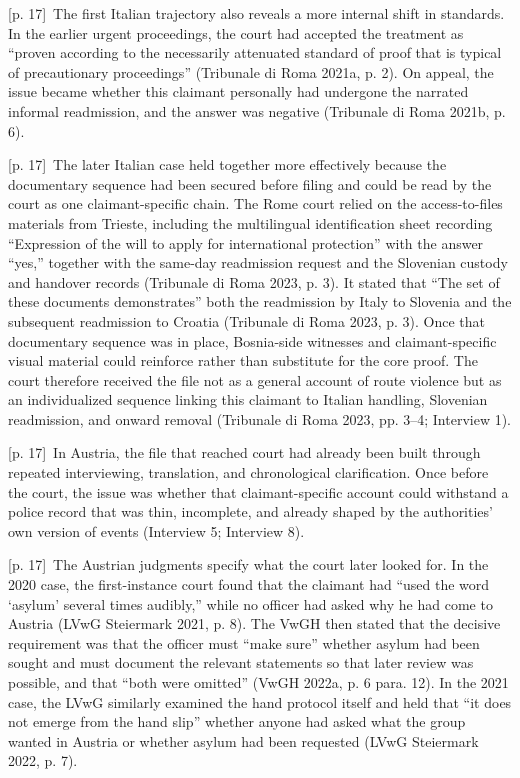 \documentclass[10pt,a4paper]{article}
\begin{document}
{\scriptsize\color{gray} [p. 17]}\ The first Italian trajectory also reveals a more internal shift in standards. In the earlier urgent proceedings, the court had accepted the treatment as “proven according to the necessarily attenuated standard of proof that is typical of precautionary proceedings” (Tribunale di Roma 2021a, p. 2). On appeal, the issue became whether this claimant personally had undergone the narrated informal readmission, and the answer was negative (Tribunale di Roma 2021b, p. 6).\par
{\scriptsize\color{gray} [p. 17]}\ The later Italian case held together more effectively because the documentary sequence had been secured before filing and could be read by the court as one claimant-specific chain. The Rome court relied on the access-to-files materials from Trieste, including the multilingual identification sheet recording “Expression of the will to apply for international protection” with the answer “yes,” together with the same-day readmission request and the Slovenian custody and handover records (Tribunale di Roma 2023, p. 3). It stated that “The set of these documents demonstrates” both the readmission by Italy to Slovenia and the subsequent readmission to Croatia (Tribunale di Roma 2023, p. 3). Once that documentary sequence was in place, Bosnia-side witnesses and claimant-specific visual material could reinforce rather than substitute for the core proof. The court therefore received the file not as a general account of route violence but as an individualized sequence linking this claimant to Italian handling, Slovenian readmission, and onward removal (Tribunale di Roma 2023, pp. 3–4; Interview 1).\par
{\scriptsize\color{gray} [p. 17]}\ In Austria, the file that reached court had already been built through repeated interviewing, translation, and chronological clarification. Once before the court, the issue was whether that claimant-specific account could withstand a police record that was thin, incomplete, and already shaped by the authorities’ own version of events (Interview 5; Interview 8).\par
{\scriptsize\color{gray} [p. 17]}\ The Austrian judgments specify what the court later looked for. In the 2020 case, the first-instance court found that the claimant had “used the word ‘asylum’ several times audibly,” while no officer had asked why he had come to Austria (LVwG Steiermark 2021, p. 8). The VwGH then stated that the decisive requirement was that the officer must “make sure” whether asylum had been sought and must document the relevant statements so that later review was possible, and that “both were omitted” (VwGH 2022a, p. 6 para. 12). In the 2021 case, the LVwG similarly examined the hand protocol itself and held that “it does not emerge from the hand slip” whether anyone had asked what the group wanted in Austria or whether asylum had been requested (LVwG Steiermark 2022, p. 7).\par
\end{document}
